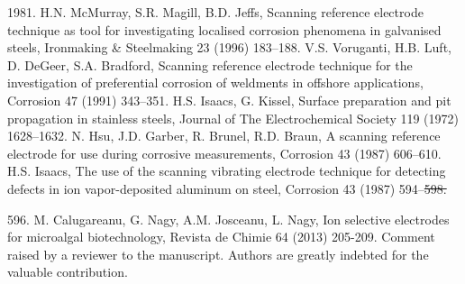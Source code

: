\documentclass[3p]{elsarticle}
\providecommand{\DIFadd}[1]{{\protect\color{blue}#1}} %
\providecommand{\DIFdel}[1]{{\protect\color{red}\sout{#1}}}                      %
\providecommand{\DIFaddbegin}{} %
\providecommand{\DIFaddend}{} %
\providecommand{\DIFdelbegin}{} %
\providecommand{\DIFdelend}{} %
\begin{document}
\begin{thebibliography}{5}
{}\DIFdelend \DIFaddbegin \DIFadd{1981.
}\DIFaddend {}H.N. McMurray, S.R. Magill, B.D. Jeffs, Scanning reference electrode technique as tool for investigating localised corrosion phenomena in galvanised steels, Ironmaking \& Steelmaking 23 (1996) 183–188.
V.S. Voruganti, H.B. Luft, D. DeGeer, S.A. Bradford, Scanning reference electrode technique for the investigation of preferential corrosion of weldments in offshore applications, Corrosion 47 (1991) 343–351.
H.S. Isaacs, G. Kissel, Surface preparation and pit propagation in stainless steels, Journal of The Electrochemical Society 119 (1972) 1628–1632.
N. Hsu, J.D. Garber, R. Brunel, R.D. Braun, A scanning reference electrode for use during corrosive measurements, Corrosion 43 (1987) 606–610.
H.S. Isaacs, The use of the scanning vibrating electrode technique for detecting defects in ion vapor-deposited aluminum on steel, Corrosion 43 (1987) 594–\DIFdelbegin \DIFdel{598.   
}%

\DIFdelend \DIFaddbegin \DIFadd{596.
} \DIFadd{M. Calugareanu, G. Nagy, A.M. Josceanu, L. Nagy, Ion selective electrodes for microalgal biotechnology, Revista de Chimie 64 (2013) 205-209.
} \DIFadd{Comment raised by a reviewer to the manuscript. Authors are greatly indebted for the valuable contribution.
}\DIFaddend \end{thebibliography}
\end{document}
